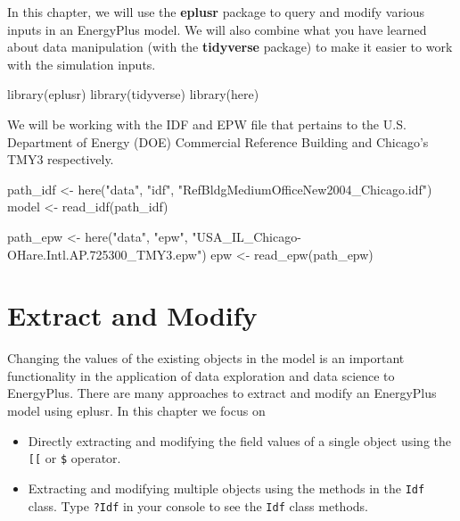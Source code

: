 \documentclass[
]{book}
\newenvironment{Shaded}{\begin{snugshade}}{\end{snugshade}}
\newcommand{\FunctionTok}[1]{\textcolor[rgb]{0.00,0.00,0.00}{#1}}
\newcommand{\NormalTok}[1]{#1}
\newcommand{\OtherTok}[1]{\textcolor[rgb]{0.56,0.35,0.01}{#1}}
\newcommand{\StringTok}[1]{\textcolor[rgb]{0.31,0.60,0.02}{#1}}
\begin{document}
In this chapter, we will use the \textbf{eplusr} package to query and modify various inputs in an EnergyPlus model. We will also combine what you have learned about data manipulation (with the \textbf{tidyverse} package) to make it easier to work with the simulation inputs.

\begin{Shaded}
\begin{Highlighting}[]
\FunctionTok{library}\NormalTok{(eplusr)}
\FunctionTok{library}\NormalTok{(tidyverse)}
\FunctionTok{library}\NormalTok{(here)}
\end{Highlighting}
\end{Shaded}

We will be working with the IDF and EPW file that pertains to the U.S. Department of Energy (DOE) Commercial Reference Building and Chicago's TMY3 respectively.

\begin{Shaded}
\begin{Highlighting}[]
\NormalTok{path\_idf }\OtherTok{\textless{}{-}} \FunctionTok{here}\NormalTok{(}\StringTok{"data"}\NormalTok{, }\StringTok{"idf"}\NormalTok{, }\StringTok{"RefBldgMediumOfficeNew2004\_Chicago.idf"}\NormalTok{)}
\NormalTok{model }\OtherTok{\textless{}{-}} \FunctionTok{read\_idf}\NormalTok{(path\_idf)}

\NormalTok{path\_epw }\OtherTok{\textless{}{-}} \FunctionTok{here}\NormalTok{(}\StringTok{"data"}\NormalTok{, }\StringTok{"epw"}\NormalTok{, }\StringTok{"USA\_IL\_Chicago{-}OHare.Intl.AP.725300\_TMY3.epw"}\NormalTok{)}
\NormalTok{epw }\OtherTok{\textless{}{-}} \FunctionTok{read\_epw}\NormalTok{(path\_epw)}
\end{Highlighting}
\end{Shaded}

\hypertarget{extract-and-modify}{%
\section{Extract and Modify}\label{extract-and-modify}}

Changing the values of the existing objects in the model is an important functionality in the application of data exploration and data science to EnergyPlus. There are many approaches to extract and modify an EnergyPlus model using eplusr. In this chapter we focus on

\begin{itemize}
\item
  Directly extracting and modifying the field values of a single object using the \texttt{{[}{[}} or \texttt{\$} operator.
\item
  Extracting and modifying multiple objects using the methods in the \texttt{Idf} class. Type \texttt{?Idf} in your console to see the \texttt{Idf} class methods.
\end{itemize}
\end{document}
